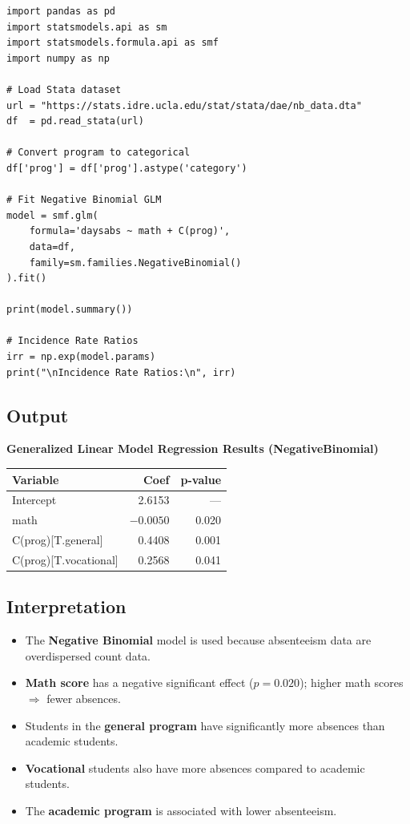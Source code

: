 \documentclass[12pt,a4paper]{article}
\begin{document}
\begin{lstlisting}
import pandas as pd
import statsmodels.api as sm
import statsmodels.formula.api as smf
import numpy as np

# Load Stata dataset
url = "https://stats.idre.ucla.edu/stat/stata/dae/nb_data.dta"
df  = pd.read_stata(url)

# Convert program to categorical
df['prog'] = df['prog'].astype('category')

# Fit Negative Binomial GLM
model = smf.glm(
    formula='daysabs ~ math + C(prog)',
    data=df,
    family=sm.families.NegativeBinomial()
).fit()

print(model.summary())

# Incidence Rate Ratios
irr = np.exp(model.params)
print("\nIncidence Rate Ratios:\n", irr)
\end{lstlisting}

\subsection{Output}

\begin{outputbox}
\textbf{Generalized Linear Model Regression Results (NegativeBinomial)}
\begin{center}
\begin{tabular}{lrr}
\toprule
Variable                & Coef    & p-value \\
\midrule
Intercept               & 2.6153  & ---     \\
math                    & $-0.0050$ & 0.020  \\
C(prog)[T.general]      & 0.4408  & 0.001   \\
C(prog)[T.vocational]   & 0.2568  & 0.041   \\
\bottomrule
\end{tabular}
\end{center}
\end{outputbox}

\subsection{Interpretation}

\begin{interpbox}
\begin{itemize}[noitemsep]
  \item The \textbf{Negative Binomial} model is used because absenteeism data are overdispersed count data.
  \item \textbf{Math score} has a negative significant effect ($p = 0.020$); higher math scores $\Rightarrow$ fewer absences.
  \item Students in the \textbf{general program} have significantly more absences than academic students.
  \item \textbf{Vocational} students also have more absences compared to academic students.
  \item The \textbf{academic program} is associated with lower absenteeism.
\end{itemize}
\end{interpbox}
\end{document}
